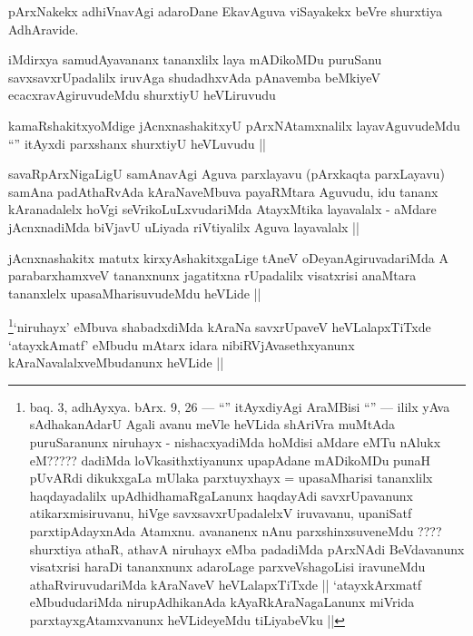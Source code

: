 \begin{artha}
pArxNakekx adhiVnavAgi adaroDane EkavAguva viSayakekx beVre shurxtiya AdhAravide.
\end{artha}

\begin{artha}
iMdirxya samudAyavananx tananxlilx laya mADikoMDu puruSanu savxsavxrUpadalilx iruvAga shudadhxvAda pAnavemba beMkiyeV ecacxravAgiruvudeMdu shurxtiyU heVLiruvudu
\end{artha}

\begin{artha}
kamaRshakitxyoMdige jAcnxnashakitxyU pArxNAtamxnalilx layavAguvudeMdu ``\stext'' itAyxdi parxshanx shurxtiyU heVLuvudu ||
\end{artha}

\begin{artha}
savaRpArxNigaLigU samAnavAgi Aguva parxlayavu (pArxkaqta parxLayavu) samAna padAthaRvAda kAraNaveMbuva payaRMtara Aguvudu, idu tananx kAranadalelx hoVgi seVrikoLuLxvudariMda AtayxMtika layavalalx - aMdare jAcnxnadiMda biVjavU uLiyada riVtiyalilx Aguva layavalalx ||
\end{artha}

\begin{artha}
jAcnxnashakitx matutx kirxyAshakitxgaLige tAneV oDeyanAgiruvadariMda A parabarxhamxveV tananxnunx jagatitxna rUpadalilx visatxrisi anaMtara tananxlelx upasaMharisuvudeMdu heVLide ||
\end{artha}


\begin{artha}
\footnote[1]{baq. 3, adhAyxya. bArx. 9, 26 --- ``\stext'' itAyxdiyAgi AraMBisi ``\stext'' --- ililx yAva sAdhakanAdarU Agali avanu meVle heVLida shAriVra muMtAda puruSaranunx niruhayx - nishacxyadiMda hoMdisi aMdare eMTu nAlukx eM????? dadiMda loVkasithxtiyanunx upapAdane mADikoMDu punaH pUvARdi dikukxgaLa mUlaka parxtuyxhayx = upasaMharisi tananxlilx haqdayadalilx upAdhidhamaRgaLanunx haqdayAdi savxrUpavanunx atikarxmisiruvanu, hiVge savxsavxrUpadalelxV iruvavanu, upaniSatf parxtipAdayxnAda Atamxnu. avananenx nAnu parxshinxsuveneMdu ???? shurxtiya athaR, athavA niruhayx eMba padadiMda pArxNAdi BeVdavanunx visatxrisi haraDi tananxnunx adaroLage parxveVshagoLisi iravuneMdu athaRviruvudariMda kAraNaveV heVLalapxTiTxde || `atayxkArxmatf eMbududariMda nirupAdhikanAda kAyaRkAraNagaLanunx miVrida parxtayxgAtamxvanunx heVLideyeMdu tiLiyabeVku ||}`niruhayx' eMbuva shabadxdiMda kAraNa savxrUpaveV heVLalapxTiTxde `atayxkAmatf' eMbudu mAtarx idara nibiRVjAvasethxyanunx kAraNavalalxveMbudanunx heVLide ||
\end{artha}

